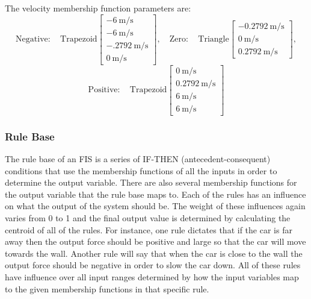 \documentclass[submit]{aiaa-tc}%
\begin{document}
The velocity membership function parameters are:
\begin{displaymath}
\mathrm{Negative:}\quad \mathrm{Trapezoid}\begin{bmatrix}
\SI{-6}{\metre\per\second}\\\SI{-6}{\metre\per\second}\\\SI{-.2792}{\metre\per\second}\\\SI{0}{\metre\per\second}
\end{bmatrix},
\quad
\mathrm{Zero:}\quad \mathrm{Triangle}\begin{bmatrix}
\SI{-0.2792}{\metre\per\second}\\\SI{0}{\metre\per\second}\\\SI{0.2792}{\metre\per\second}
\end{bmatrix},
\end{displaymath}
\begin{displaymath}
\mathrm{Positive:}\quad \mathrm{Trapezoid}\begin{bmatrix}
\SI{0}{\metre\per\second}\\\SI{0.2792}{\metre\per\second}\\\SI{6}{\metre\per\second}\\\SI{6}{\metre\per\second}
\end{bmatrix}
\end{displaymath}
\subsubsection{Rule Base}\label{ss:rulebase}
The rule base of an FIS is a series of IF-THEN (antecedent-consequent) conditions that use the membership functions of all the inputs in order to determine the output variable. There are also several membership functions for the output variable that the rule base maps to. Each of the rules has an influence on what the output of the system should be. The weight of these influences again varies from 0 to 1 and the final output value is determined by calculating the centroid of all of the rules. For instance, one rule dictates that if the car is far away then the output force should be positive and large so that the car will move towards the wall. Another rule will say that when the car is close to the wall the output force should be negative in order to slow the car down. All of these rules have influence over all input ranges determined by how the input variables map to the given membership functions in that specific rule.
\end{document}
